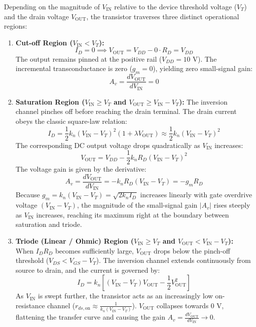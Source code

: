 \documentclass[11pt,a4paper]{article}
\begin{document}
Depending on the magnitude of $V_{\text{IN}}$ relative to the device threshold voltage ($V_T$) and the drain voltage $V_{\text{OUT}}$, the transistor traverses three distinct operational regions:
\begin{enumerate}
    \item \textbf{Cut-off Region ($V_{\text{IN}} < V_T$):}
    \begin{equation}
        I_D = 0 \implies V_{\text{OUT}} = V_{DD} - 0 \cdot R_D = V_{DD}
    \end{equation}
    The output remains pinned at the positive rail ($V_{DD} = 10\text{ V}$). The incremental transconductance is zero ($g_m = 0$), yielding zero small-signal gain:
    \begin{equation}
        A_v = \frac{dV_{\text{OUT}}}{dV_{\text{IN}}} = 0
    \end{equation}

    \item \textbf{Saturation Region ($V_{\text{IN}} \ge V_T$ and $V_{\text{OUT}} \ge V_{\text{IN}} - V_T$):}
    The inversion channel pinches off before reaching the drain terminal. The drain current obeys the classic square-law relation:
    \begin{equation}
        I_D = \frac{1}{2} k_n (V_{\text{IN}} - V_T)^2 (1 + \lambda V_{\text{OUT}}) \approx \frac{1}{2} k_n (V_{\text{IN}} - V_T)^2
    \end{equation}
    The corresponding DC output voltage drops quadratically as $V_{\text{IN}}$ increases:
    \begin{equation}
        V_{\text{OUT}} = V_{DD} - \frac{1}{2} k_n R_D (V_{\text{IN}} - V_T)^2
    \end{equation}
    The voltage gain is given by the derivative:
    \begin{equation}
        A_v = \frac{dV_{\text{OUT}}}{dV_{\text{IN}}} = - k_n R_D (V_{\text{IN}} - V_T) = - g_m R_D
    \end{equation}
    Because $g_m = k_n (V_{\text{IN}} - V_T) = \sqrt{2 k_n I_D}$ increases linearly with gate overdrive voltage $(V_{\text{IN}} - V_T)$, the magnitude of the small-signal gain $|A_v|$ rises steeply as $V_{\text{IN}}$ increases, reaching its maximum right at the boundary between saturation and triode.

    \item \textbf{Triode (Linear / Ohmic) Region ($V_{\text{IN}} \ge V_T$ and $V_{\text{OUT}} < V_{\text{IN}} - V_T$):}
    When $I_D R_D$ becomes sufficiently large, $V_{\text{OUT}}$ drops below the pinch-off threshold ($V_{DS} < V_{GS} - V_T$). The inversion channel extends continuously from source to drain, and the current is governed by:
    \begin{equation}
        I_D = k_n \left[ (V_{\text{IN}} - V_T) V_{\text{OUT}} - \frac{1}{2} V_{\text{OUT}}^2 \right]
    \end{equation}
    As $V_{\text{IN}}$ is swept further, the transistor acts as an increasingly low on-resistance channel ($r_{ds,\text{on}} \approx \frac{1}{k_n(V_{\text{IN}} - V_T)}$). $V_{\text{OUT}}$ collapses towards $0\text{ V}$, flattening the transfer curve and causing the gain $A_v = \frac{dV_{\text{OUT}}}{dV_{\text{IN}}} \to 0$.
\end{enumerate}
\end{document}
